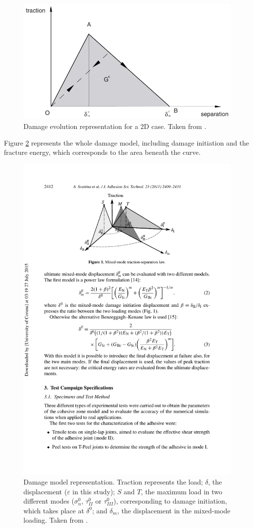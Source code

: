 \documentclass[cmfonts]{witpress}
\begin{document}
\begin{figure}
	\centering
	\includegraphics[width=0.7\linewidth]{figures/IMG_CUTRES/damage_evolution_manual.pdf}
	\caption[Damage evolution representation for a 2D case.]{Damage evolution representation for a 2D case. Taken from \cite{Abaqus613Manual}.}
	\label{fig:damage_evo2D}
\end{figure}

Figure \ref{fig:damage} represents the whole damage model, including damage initiation and the fracture energy, which corresponds to the area beneath the curve.

\begin{figure}
	\centering
	\includegraphics[width=0.7\linewidth]{figures/IMG_CUTRES/scattina_quads}
	\caption[Damage model representation.]{Damage model representation. Traction represents the load; $\delta$, the displacement ($\varepsilon$ in this study); $S$ and $T$, the maximum load in two different modes ($\sigma_{n}^{0}$, $\tau_{II}^{0}$ or $\tau_{III}^{0}$), corresponding to damage initiation, which takes place at $\delta^0$; and $\delta_m$, the displacement in the mixed-mode loading. Taken from \cite{Scattina2011}.}
	\label{fig:damage}
\end{figure}
\end{document}
